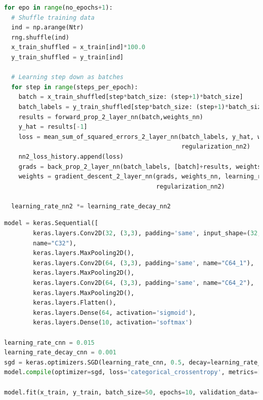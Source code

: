 \documentclass[10pt, a4paper, twocolumn]{article}
\begin{document}
\begin{lstlisting}[frame=single,language=python,caption=SGD implementation]
for epo in range(no_epochs+1):
  # Shuffle training data
  ind = np.arange(Ntr)
  rng.shuffle(ind)
  x_train_shuffled = x_train[ind]*100.0
  y_train_shuffled = y_train[ind]

  # Learning step down as batches
  for step in range(steps_per_epoch):
    batch = x_train_shuffled[step*batch_size: (step+1)*batch_size]
    batch_labels = y_train_shuffled[step*batch_size: (step+1)*batch_size]
    results = forward_prop_2_layer_nn(batch,weights_nn)
    y_hat = results[-1]
    loss = mean_sum_of_squared_errors_2_layer_nn(batch_labels, y_hat, weights_nn,
                                                 regularization_nn2)
    nn2_loss_history.append(loss)
    grads = back_prop_2_layer_nn(batch_labels, [batch]+results, weights_nn)
    weights = gradient_descent_2_layer_nn(grads, weights_nn, learning_rate_nn2,
                                          regularization_nn2)

  learning_rate_nn2 *= learning_rate_decay_nn2
\end{lstlisting}

\begin{lstlisting}[frame=single,language=python,caption=CNN implementation]
model = keras.Sequential([
		keras.layers.Conv2D(32, (3,3), padding='same', input_shape=(32,32,3),\
		name="C32"),
		keras.layers.MaxPooling2D(),
		keras.layers.Conv2D(64, (3,3), padding='same', name="C64_1"),
		keras.layers.MaxPooling2D(),
		keras.layers.Conv2D(64, (3,3), padding='same', name="C64_2"),
		keras.layers.MaxPooling2D(),
		keras.layers.Flatten(),
		keras.layers.Dense(64, activation='sigmoid'),
		keras.layers.Dense(10, activation='softmax')

learning_rate_cnn = 0.015
learning_rate_decay_cnn = 0.001
sgd = keras.optimizers.SGD(learning_rate_cnn, 0.5, decay=learning_rate_decay_cnn)
model.compile(optimizer=sgd, loss='categorical_crossentropy', metrics=['accuracy'])

model.fit(x_train, y_train, batch_size=50, epochs=10, validation_data=(x_val, y_val))
\end{lstlisting}
\end{document}
